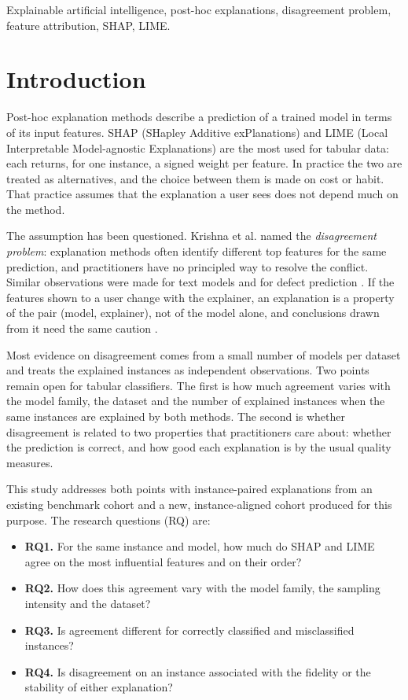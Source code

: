 \begin{keywords}
Explainable artificial intelligence, post-hoc explanations, disagreement problem, feature attribution, SHAP, LIME.
\end{keywords}

\section{Introduction}
\label{sec:introduction}

Post-hoc explanation methods describe a prediction of a trained model in terms of its input
features. SHAP (SHapley Additive exPlanations) \cite{lundberg2017unified} and LIME (Local
Interpretable Model-agnostic Explanations) \cite{ribeiro2016why} are the most used
for tabular data: each returns, for one instance, a signed weight per feature. In practice
the two are treated as alternatives, and the choice between them is made on cost or habit.
That practice assumes that the explanation a user sees does not depend much on the method.

The assumption has been questioned. Krishna et al. \cite{krishna2024disagreement} named
the \emph{disagreement problem}: explanation methods often identify different top
features for the same prediction, and practitioners have no principled way to resolve the
conflict. Similar observations were made for text models \cite{neely2021order} and for
defect prediction \cite{roy2022why}. If the features shown to a user change with the
explainer, an explanation is a property of the pair (model, explainer), not of the model
alone, and conclusions drawn from it need the same caution
\cite{rudin2019stop,doshivelez2017rigorous}.

Most evidence on disagreement comes from a small number of models per dataset and treats
the explained instances as independent observations. Two points remain open for tabular
classifiers. The first is how much agreement varies with the model family, the dataset
and the number of explained instances when the same instances are explained by both
methods. The second is whether disagreement is related to two properties that
practitioners care about: whether the prediction is correct, and how good each
explanation is by the usual quality measures.

This study addresses both points with instance-paired explanations from an existing
benchmark cohort and a new, instance-aligned cohort produced for this purpose. The
research questions (RQ) are:

\begin{itemize}
\item \textbf{RQ1.} For the same instance and model, how much do SHAP and LIME agree on
the most influential features and on their order?
\item \textbf{RQ2.} How does this agreement vary with the model family, the sampling
intensity and the dataset?
\item \textbf{RQ3.} Is agreement different for correctly classified and misclassified
instances?
\item \textbf{RQ4.} Is disagreement on an instance associated with the fidelity or the
stability of either explanation?
\end{itemize}

